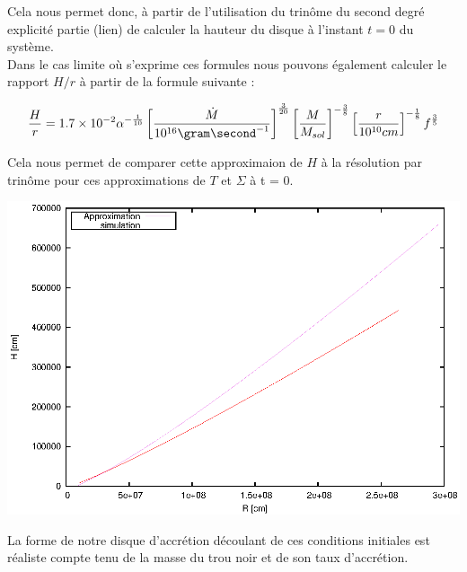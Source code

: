 Cela nous permet donc, à partir de l'utilisation du trinôme du second degré explicité partie (lien) de calculer la hauteur du disque à l'instant $t = 0$ du système. \\

Dans le cas limite où s'exprime ces formules nous pouvons également calculer le rapport $H/r$ à partir de la formule suivante : 

\begin{equation}
	\frac{H}{r} = 1.7 \times 10^{-2}\alpha^{- \frac{1}{10}} \left[ \frac{\dot{M}}{10^{16} \gram \second^{-1}} \right]^{\frac{3}{20}} \left[ \frac{M}{M_{sol}}\right]^{- \frac{3}{8}} \left[ \frac{r}{10^{10} cm}\right]^{- \frac{1}{8}} f^{\frac{3}{5}}
\end{equation}
 
Cela nous permet de comparer cette approximaion de $H$ à la résolution par trinôme pour ces approximations de $T$ et $\Sigma$ à t = 0. \\

\begin{center}
	\includegraphics[scale=0.8]{ic_h.eps}
\end{center} 

La forme de notre disque d'accrétion découlant de ces conditions initiales est réaliste compte tenu de la masse du trou noir et de son taux d'accrétion.
